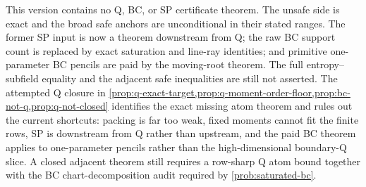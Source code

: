 \documentclass[a4paper,11pt]{amsart}
\theoremstyle{remark}
\begin{document}
This version contains no Q, BC, or SP certificate theorem.  The unsafe side is exact and the broad safe anchors are unconditional in their stated ranges.  The former SP input is now a theorem downstream from Q; the raw BC support count is replaced by exact saturation and line-ray identities; and primitive one-parameter BC pencils are paid by the moving-root theorem.  The full entropy--subfield equality and the adjacent safe inequalities are still not asserted.  The attempted Q closure in \cref{prop:q-exact-target,prop:q-moment-order-floor,prop:bc-not-q,prop:q-not-closed} identifies the exact missing atom theorem and rules out the current shortcuts: packing is far too weak, fixed moments cannot fit the finite rows, SP is downstream from Q rather than upstream, and the paid BC theorem applies to one-parameter pencils rather than the high-dimensional boundary-Q slice.  A closed adjacent theorem still requires a row-sharp Q atom bound together with the BC chart-decomposition audit required by \cref{prob:saturated-bc}.
\end{document}
